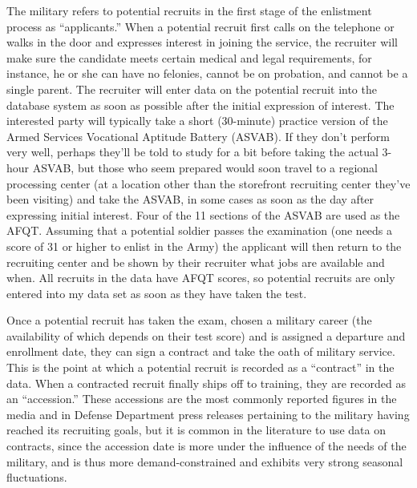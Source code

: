 \documentclass[12pt] {article}
\begin{document}
The military refers to potential recruits in the first stage of the enlistment process as {}``applicants.'' When a potential recruit first calls on
the telephone or walks in the door and expresses interest in joining
the service, the recruiter will make sure the candidate meets certain
medical and legal requirements, for instance, he or she can have no
felonies, cannot be on probation, and cannot be a single parent. The
recruiter will enter data on the potential recruit into the database
system as soon as possible after the initial expression of interest.
The interested party will typically take a short (30-minute) practice
version of the Armed Services Vocational Aptitude Battery (ASVAB).
If they don't perform very well, perhaps they'll be told to study
for a bit before taking the actual 3-hour ASVAB, but those who seem
prepared would soon travel to a regional processing center (at a location
other than the storefront recruiting center they've been visiting)
and take the ASVAB, in some cases as soon as the day after expressing
initial interest. Four of the 11 sections of the ASVAB are used as
the AFQT. Assuming that a potential soldier passes the examination
(one needs a score of 31 or higher to enlist in the Army) the applicant will
then return to the recruiting center and be shown by their recruiter
what jobs are available and when. All recruits in the data have AFQT scores, so potential recruits are only entered into my data set as soon as they have taken the test.

Once a potential recruit has taken the exam, chosen a military career
(the availability of which depends on their test score) and is assigned
a departure and enrollment date, they can sign a contract and take
the oath of military service. This is the point at which a potential
recruit is recorded as a ``contract'' in the data. When a contracted
recruit finally ships off to training, they are recorded as an {}``accession.''
These accessions are the most commonly reported figures in the media
and in Defense Department press releases pertaining to the military
having reached its recruiting goals, but it is common in the literature
to use data on contracts, since the accession date is more under the
influence of the needs of the military, and is thus more demand-constrained
and exhibits very strong seasonal fluctuations.
\end{document}
